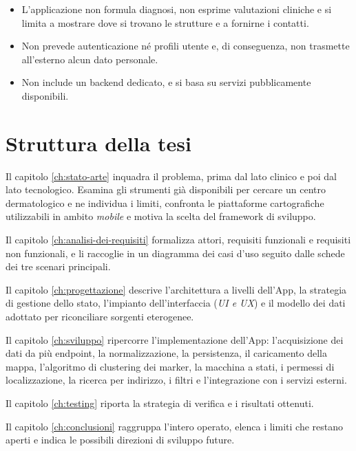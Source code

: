 \begin{itemize}
  \item L'applicazione non formula diagnosi, non esprime valutazioni cliniche e si limita a mostrare dove si trovano le strutture
  e a fornirne i contatti.
  \item Non prevede autenticazione né profili utente e, di conseguenza, non trasmette all'esterno alcun dato personale.
  \item Non include un backend dedicato, e si basa su servizi pubblicamente disponibili. %
\end{itemize}




\section{Struttura della tesi}\label{sec:struttura-tesi}

Il capitolo \ref{ch:stato-arte} inquadra il problema, prima dal lato clinico e poi dal lato tecnologico.
Esamina gli strumenti già disponibili per cercare un centro dermatologico e ne individua i limiti, confronta le piattaforme cartografiche utilizzabili
in ambito \textit{mobile} e motiva la scelta del framework di sviluppo.

Il capitolo \ref{ch:analisi-dei-requisiti} formalizza attori, requisiti funzionali e requisiti non funzionali, e li raccoglie
in un diagramma dei casi d'uso seguito dalle schede dei tre scenari principali.

Il capitolo \ref{ch:progettazione} descrive l'architettura a livelli dell'App, la strategia di gestione dello stato,
l'impianto dell'interfaccia (\textit{UI e UX}) e il modello dei dati adottato per riconciliare sorgenti eterogenee.

Il capitolo \ref{ch:sviluppo} ripercorre l'implementazione dell'App:
l'acquisizione dei dati da più endpoint, la normalizzazione, la persistenza, il caricamento della mappa, l'algoritmo di clustering dei marker, la macchina a stati,
i permessi di localizzazione, la ricerca per indirizzo, i filtri e l'integrazione con i servizi esterni. %

Il capitolo \ref{ch:testing} riporta la strategia di verifica e i risultati ottenuti.

Il capitolo \ref{ch:conclusioni} raggruppa l'intero operato, elenca i limiti che restano aperti e indica le possibili direzioni di
sviluppo future.

